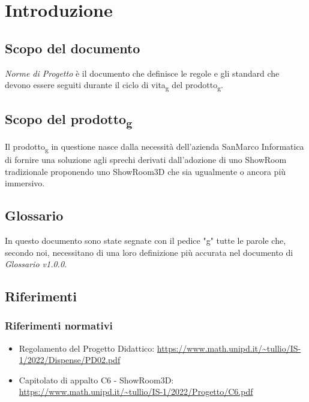 \documentclass[a4paper]{article}
\begin{document}




\pagebreak

{
    \hypersetup{linkcolor=black}
    \tableofcontents
    \listoffigures %
}
\pagebreak

\section{Introduzione}

\subsection{Scopo del documento}
\textit{Norme di Progetto} è il documento che definisce le regole e gli standard che devono essere seguiti durante il ciclo di vita\textsubscript{g} del prodotto\textsubscript{g}.
\subsection{Scopo del prodotto\textsubscript{g}}
Il prodotto\textsubscript{g} in questione nasce dalla necessità dell'azienda SanMarco Informatica di fornire una soluzione agli sprechi
derivati dall'adozione di uno ShowRoom tradizionale proponendo uno ShowRoom3D che sia ugualmente o ancora più immersivo.
\subsection{Glossario}
In questo documento sono state segnate con il pedice "g" tutte le parole che, secondo noi, necessitano di una loro definizione più accurata nel documento di \textit{Glossario v1.0.0}.
\subsection{Riferimenti}
\subsubsection{Riferimenti normativi}
\begin{itemize}
    \item Regolamento del Progetto Didattico: \url{https://www.math.unipd.it/~tullio/IS-1/2022/Dispense/PD02.pdf}
    \item Capitolato di appalto C6 - ShowRoom3D: \url{https://www.math.unipd.it/~tullio/IS-1/2022/Progetto/C6.pdf}
\end{itemize}
\end{document}
